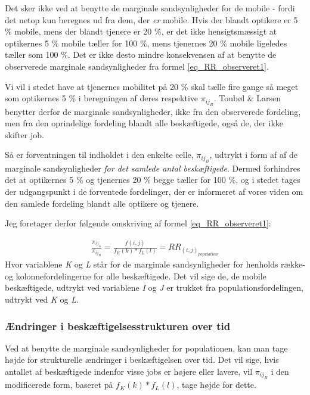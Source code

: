 Det sker ikke ved at benytte de marginale sandsynligheder for de mobile - fordi det netop kun beregnes ud fra dem, der \emph{er} mobile. Hvis der blandt optikere er 5 \% mobile, mens der blandt tjenere er 20 \%, er det ikke hensigtsmæssigt at optikernes 5 \% mobile tæller for 100 \%, mens tjenernes 20 \% mobile ligeledes tæller som 100 \%. Det er ikke desto mindre konsekvensen af at benytte de observerede marginale sandsynligheder fra formel \ref{eq_RR_observeret1}. \label{optikereogtjenere}

Vi vil i stedet have at tjenernes mobilitet på 20 \% skal tælle fire gange så meget som optikernes 5 \% i beregningen af deres respektive $\pi_{ij_{B}}$. Toubøl \& Larsen benytter derfor de marginale sandsynligheder, ikke fra den observerede fordeling, men fra den oprindelige fordeling blandt alle beskæftigede, også de, der ikke skifter job.

Så er forventningen til indholdet i den enkelte celle, $\pi_{ij_{B}}$, udtrykt i form af af de marginale sandsynligheder \emph{for det samlede antal beskæftigede}. Dermed forhindres det at optikernes 5 \% og tjenernes 20 \% begge tæller for 100 \%, og i stedet tages der udgangspunkt i de forventede fordelinger, der er informeret af vores viden om den samlede fordeling blandt alle optikere og tjenere.  

Jeg foretager derfor følgende omskriving af formel \ref{eq_RR_observeret1}:

%
\begin{align} \label{eq_RR_observeret2}
\frac{\pi_{ij_{A}}}{\pi_{ij_{B}}} = \frac{f(i,j)}{f_{K}(k)*f_{L}(l)} = RR_{(i,j)_{population}}
\end{align} 
%
Hvor variablene \emph{K} og \emph{L} står for de marginale sandsynligheder for henholds række- og kolonnefordelingerne for alle beskæftigede. Det vil sige de, de mobile beskæftigede, udtrykt ved  variablene \emph{I} og \emph{J} er trukket fra populationsfordelingen, udtrykt ved \emph{K} og \emph{L}.


%
\subsubsection{Ændringer i beskæftigelsesstrukturen over tid \label{subsec_}}
%


Ved at benytte de marginale sandsynligheder for populationen, kan man tage højde for strukturelle ændringer i beskæftigelsen over tid. Det vil sige, hvis antallet af beskæftigede indenfor visse jobs er højere eller lavere, vil $\pi_{ij_{B}}$ i den modificerede form, baseret på $f_{K}(k)*f_{L}(l)$, tage højde for dette. 


